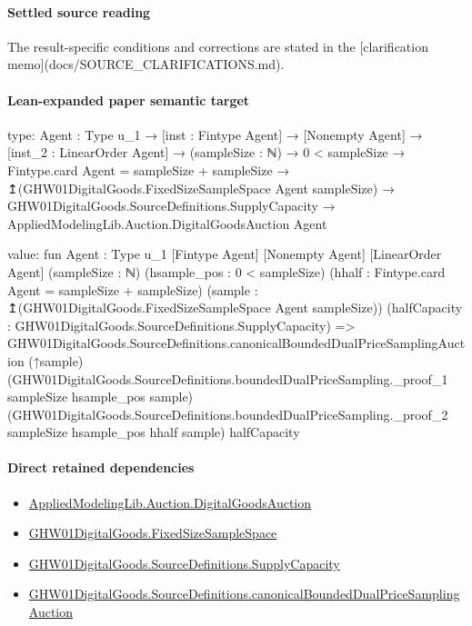 \documentclass[10pt]{article}
\begin{document}
\paragraph{Settled source reading}
\begin{sloppypar}
The result-\allowbreak{}specific conditions and corrections are stated in the [clarification memo](docs/\allowbreak{}SOURCE\_\allowbreak{}CLARIFICATIONS.\allowbreak{}md).\allowbreak{}
\end{sloppypar}

\paragraph{Lean-expanded paper semantic target}
\begin{ReviewVerbatim}
type:
{Agent : Type u_1} →
  [inst : Fintype Agent] →
    [Nonempty Agent] →
      [inst_2 : LinearOrder Agent] →
        (sampleSize : ℕ) →
          0 < sampleSize →
            Fintype.card Agent = sampleSize + sampleSize →
              ↥(GHW01DigitalGoods.FixedSizeSampleSpace Agent sampleSize) →
                GHW01DigitalGoods.SourceDefinitions.SupplyCapacity →
                  AppliedModelingLib.Auction.DigitalGoodsAuction Agent

value:
fun {Agent : Type u_1} [Fintype Agent] [Nonempty Agent] [LinearOrder Agent] (sampleSize : ℕ)
    (hsample_pos : 0 < sampleSize) (hhalf : Fintype.card Agent = sampleSize + sampleSize)
    (sample : ↥(GHW01DigitalGoods.FixedSizeSampleSpace Agent sampleSize))
    (halfCapacity : GHW01DigitalGoods.SourceDefinitions.SupplyCapacity) =>
  GHW01DigitalGoods.SourceDefinitions.canonicalBoundedDualPriceSamplingAuction (↑sample)
    (GHW01DigitalGoods.SourceDefinitions.boundedDualPriceSampling._proof_1 sampleSize hsample_pos sample)
    (GHW01DigitalGoods.SourceDefinitions.boundedDualPriceSampling._proof_2 sampleSize hsample_pos hhalf sample)
    halfCapacity
\end{ReviewVerbatim}

\paragraph{Direct retained dependencies}
\begin{itemize}\raggedright
\item \hyperlink{governing-declaration-7d5372964da104c4}{Applied\allowbreak{}Modeling\allowbreak{}Lib.\allowbreak{}Auction.\allowbreak{}Digital\allowbreak{}Goods\allowbreak{}Auction}
\item \hyperlink{governing-declaration-54cc4fd1a8d109e5}{GHW01\allowbreak{}Digital\allowbreak{}Goods.\allowbreak{}Fixed\allowbreak{}Size\allowbreak{}Sample\allowbreak{}Space}
\item \hyperlink{governing-declaration-b45673e2f2fa9536}{GHW01\allowbreak{}Digital\allowbreak{}Goods.\allowbreak{}Source\allowbreak{}Definitions.\allowbreak{}Supply\allowbreak{}Capacity}
\item \hyperlink{governing-declaration-a9266cdf92263084}{GHW01\allowbreak{}Digital\allowbreak{}Goods.\allowbreak{}Source\allowbreak{}Definitions.\allowbreak{}canonical\allowbreak{}Bounded\allowbreak{}Dual\allowbreak{}Price\allowbreak{}Sampling\allowbreak{}Auction}
\end{itemize}
\end{document}
